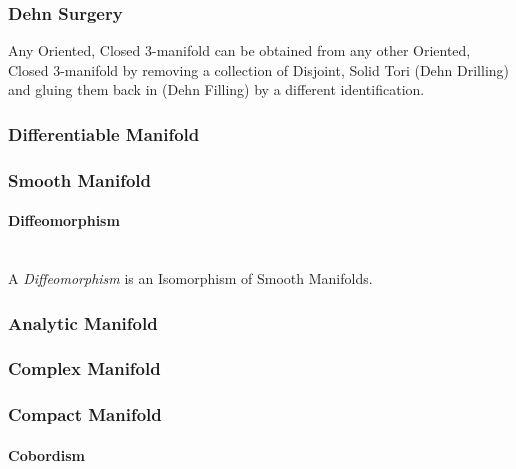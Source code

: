 \subsubsection{Dehn Surgery}\label{sec:dehn_surgery}

Any Oriented, Closed 3-manifold can be obtained from any other
Oriented, Closed 3-manifold by removing a collection of Disjoint,
Solid Tori (Dehn Drilling) and gluing them back in (Dehn Filling) by a
different identification.



\subsubsection{Differentiable Manifold}
\label{sec:differentiable_manifold}

\subsubsection{Smooth Manifold}\label{sec:smooth_manifold}

\paragraph{Diffeomorphism}\label{sec:diffeomorphism}
\hfill \\
A \emph{Diffeomorphism} is an Isomorphism of Smooth Manifolds.



\subsubsection{Analytic Manifold}\label{sec:analytic_manifold}

\subsubsection{Complex Manifold}\label{sec:complex_manifold}

\subsubsection{Compact Manifold}\label{sec:compact_manifold}

\paragraph{Cobordism}\label{sec:cobordism}



